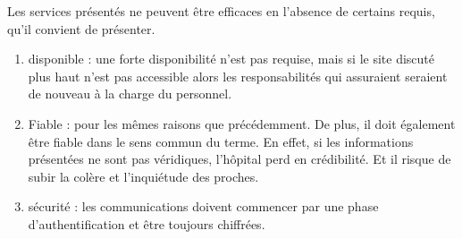 Les services présentés ne peuvent être efficaces en l'absence de certains requis, qu'il convient de présenter.
\begin{enumerate}
    \item disponible : une forte disponibilité n'est pas requise, mais si le site discuté plus haut n'est pas accessible alors les
    responsabilités qui assuraient seraient de nouveau à la charge du personnel.
    \item Fiable : pour les mêmes raisons que précédemment. De plus, il doit également être fiable dans le sens commun du terme.
    En effet, si les informations présentées ne sont pas véridiques, l'hôpital perd en crédibilité. Et il risque de subir la
    colère et l'inquiétude des proches.
    \item sécurité : les communications doivent commencer par une phase d'authentification et être toujours chiffrées.
 \end{enumerate}
